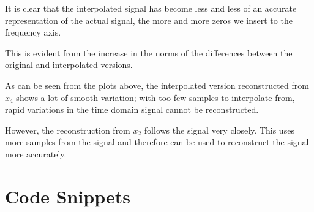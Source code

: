 \documentclass{article}[a4paper]
\begin{document}
\begin{enumerate}[label=(\alph*)]
		It is clear that the interpolated signal has become less and less of an accurate representation of the actual signal, the more and more zeros we insert to the frequency axis.
		
		This is evident from the increase in the norms of the differences between the original and interpolated versions.
		
		As can be seen from the plots above, the interpolated version reconstructed from $x_4$ shows a lot of smooth variation; with too few samples to interpolate from, rapid variations in the time domain signal cannot be reconstructed.
		
		However, the reconstruction from $x_2$ follows the signal very closely. This uses more samples from the signal and therefore can be used to reconstruct the signal more accurately.
		
	\end{enumerate}
	
	\appendix
	\section{Code Snippets}
	\label{code}
	
\end{document}
